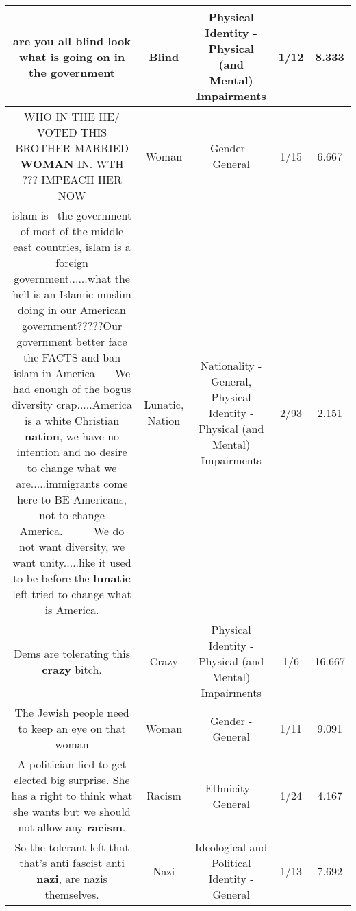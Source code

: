 \documentclass[11pt]{article}
\newlength\mylength
\begin{document}
\begin{center}
\begin{longtable}{|C{.65\mylength}|C{.30\mylength}|C{.12\mylength}|C{.12\mylength}|C{.12\mylength}|}
  \small are you all \textbf{blind} look what is going on in the government\normalsize   & Blind & Physical Identity - Physical (and Mental) Impairments & 1/12 & 8.333 \\  \hline
  \small WHO IN THE HE/ VOTED THIS BROTHER MARRIED \textbf{WOMAN} IN. WTH ??? IMPEACH HER NOW\normalsize   & Woman & Gender - General & 1/15 & 6.667 \\  \hline
  \small islam is  the government of most of the middle east countries, islam is a foreign government......what the hell is an Islamic muslim doing in our American government?????Our government better face the FACTS and ban islam in America    We had enough of the bogus diversity crap.....America is a white Christian \textbf{nation}, we have no intention and no desire to change what we are.....immigrants come here to BE Americans, not to change America.      We do not want diversity, we want unity.....like it used to be before the \textbf{lunatic} left tried to change what is America.\normalsize   & Lunatic, Nation & Nationality - General, Physical Identity - Physical (and Mental) Impairments & 2/93 & 2.151 \\  \hline
  \small Dems are tolerating this \textbf{crazy} bitch.\normalsize   & Crazy & Physical Identity - Physical (and Mental) Impairments & 1/6 & 16.667 \\  \hline
  \small The Jewish people need to keep an eye on that woman\normalsize   & Woman & Gender - General & 1/11 & 9.091 \\  \hline
  \small A politician lied to get elected big surprise. She has a right to think what she wants but we should not allow any \textbf{racism}.\normalsize   & Racism & Ethnicity - General & 1/24 & 4.167 \\  \hline
  \small So the tolerant left that that's anti fascist anti \textbf{nazi}, are nazis themselves.\normalsize   & Nazi &  Ideological and Political Identity - General & 1/13 & 7.692 \\  \hline

\end{longtable}
\end{center}
\end{document}
